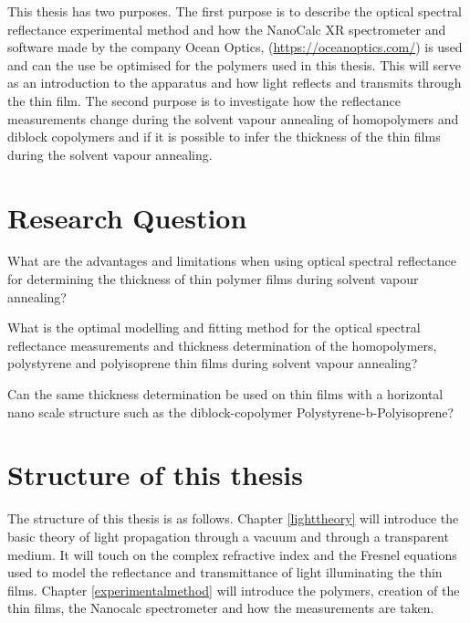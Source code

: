 \documentclass[MasterThesisMain.tex]{subfiles}
\begin{document}
This thesis has two purposes. The first purpose is to describe the optical spectral reflectance experimental method and how the NanoCalc XR spectrometer and software made by the company Ocean Optics, (\url{https://oceanoptics.com/}) is used and can the use be optimised for the polymers used in this thesis. This will serve as an introduction to the apparatus and how light reflects and transmits through the thin film. The second purpose is to investigate how the reflectance measurements change during the solvent vapour annealing of homopolymers and diblock copolymers and if it is possible to infer the thickness of the thin films during the solvent vapour annealing. 

\section{Research Question}
What are the advantages and limitations when using optical spectral reflectance for determining the thickness of thin polymer films during solvent vapour annealing?

What is the optimal modelling and fitting method for the optical spectral reflectance measurements and thickness determination of the homopolymers, polystyrene and polyisoprene thin films during solvent vapour annealing?  
		
Can the same thickness determination be used on thin films with a horizontal nano scale structure such as the diblock-copolymer Polystyrene-b-Polyisoprene?


\section{Structure of this thesis} 
The structure of this thesis is as follows. Chapter \ref{lighttheory} will introduce the basic theory of light propagation through a vacuum and through a transparent medium. It will touch on the complex refractive index and the Fresnel equations used to model the reflectance and transmittance of light illuminating the thin films. Chapter \ref{experimentalmethod} will introduce the polymers, creation of the thin films, the Nanocalc spectrometer and how the measurements are taken.  

        
\end{document}
